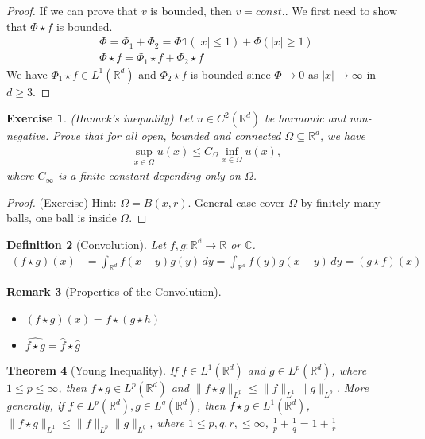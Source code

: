 \documentclass{report}
\theoremstyle{tommy}
\newtheorem{defn}{Definition}
\newtheorem{thm}[defn]{Theorem}
\newtheorem{rem}[defn]{Remark}
\newtheorem{ex}[defn]{Exercise}
\begin{document}
\begin{proof}
  If we can prove that \(v\) is bounded, then \(v = const.\). We first need to show that \(\Phi \star f\) is bounded.
  \begin{align*}
    \Phi = \Phi_1 + \Phi_2 = \Phi \mathbb{1}(|x| \le 1) + \Phi(|x| \ge 1) \\
    \Phi \star f = \Phi_1 \star f + \Phi_2 \star f
  \end{align*}
  We have \(\Phi_1 \star f \in L^1(\mathbb{R}^d)\) and \(\Phi_2 \star f\) is bounded since \(\Phi \to 0\)  as \(|x| \to \infty\)  in \(d \ge 3\).
\end{proof}

\begin{ex} (Hanack's inequality)
  Let \(u \in C^2(\mathbb{R}^d)\) be harmonic and non-negative. Prove that for all open, bounded and connected \(\Omega \subseteq \mathbb{R}^d\), we have
  \begin{align*}
    \sup_{x \in \Omega} u(x) \le C_\Omega \inf_{x \in \Omega} u(x),
  \end{align*}
  where \(C_\infty\) is a finite constant depending only on \(\Omega\).
\end{ex}

\begin{proof} (Exercise)
  Hint: \(\Omega = B(x,r)\). General case cover \(\Omega\) by finitely many balls, one ball is inside \(\Omega\).
\end{proof}


\begin{defn}[Convolution]
  Let \(f, g: \mathbb{{R}^d \to \mathbb{R}}\) or \(\mathbb{C}\).
  \begin{align*}
    (f \star g)(x)
    &= \int_{\mathbb{R}^d} f(x-y) g(y) \, dy
    = \int_{\mathbb{R}^d} f(y) g(x-y) \, dy 
    = (g \star f)(x)
  \end{align*}
\end{defn}

\begin{rem}[Properties of the Convolution]
  \begin{itemize}
    \item \((f \star g)(x) = f \star (g \star h)\)
    \item \(\hat{f \star g} = \hat f \star \hat g\)
  \end{itemize}
\end{rem}


\begin{thm}[Young Inequality]
  If \(f \in L^1(\mathbb{R}^d)\) and \(g \in L^p(\mathbb{R}^d)\), where \(1 \le p \le \infty\), then \(f \star g \in L^p(\mathbb{R}^d)\) and \(\|f \star g \|_{L^p} \le \|f\|_{L^1} \|g\|_{L^p}\). More generally, if \(f \in L^p(\mathbb{R}^d), g \in L^q(\mathbb{R}^d)\), then \(f \star g \in L^1(\mathbb{R}^d)\), \(\| f \star g\|_{L^1} \le \|f\|_{L^p} \|g\|_{L^q}\), where \(1 \le p, q, r, \le \infty\), \(\frac{1}{p} + \frac{1}{q} = 1 + \frac{1}{r}\)
\end{thm}
\end{document}
